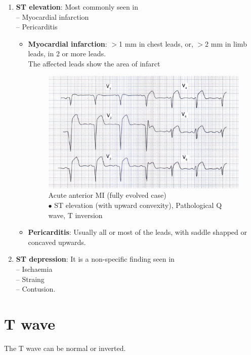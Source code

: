 \documentclass[11pt,a4paper]{report}
\begin{document}
\begin{enumerate}
	\item \textbf{ST elevation}: Most commonly seen in \\
	-- Myocardial infarction \\
	-- Pericarditis 
	\begin{itemize}
		\item \textbf{Myocardial infarction}: $>$1 mm in chest leads, or, $>$2 mm in limb leads, in 2 or more leads. \\
		The affected leads show the area of infarct
		\begin{figure}[htp]
			\centering \includegraphics[scale=1.0]{ecg-ami.png}
			\centering \caption[Acute anterior MI]{Acute anterior MI (fully evolved case) \\$\bullet$ ST elevation (with upward convexity), Pathological Q wave, T inversion \cite{abdullah-ecg}}
			\label{ecg-acute-mi}
		\end{figure}
		\item \textbf{Pericarditis}: Usually all or most of the leads, with saddle shapped or concaved upwards. 
	\end{itemize}
	\item \textbf{ST depression}: It is a non-specific finding seen in \\
	-- Ischaemia\\
	-- Straing\\
	-- Contusion. 
\end{enumerate}

\section{T wave}
The T wave can be normal or inverted. 
\end{document}
